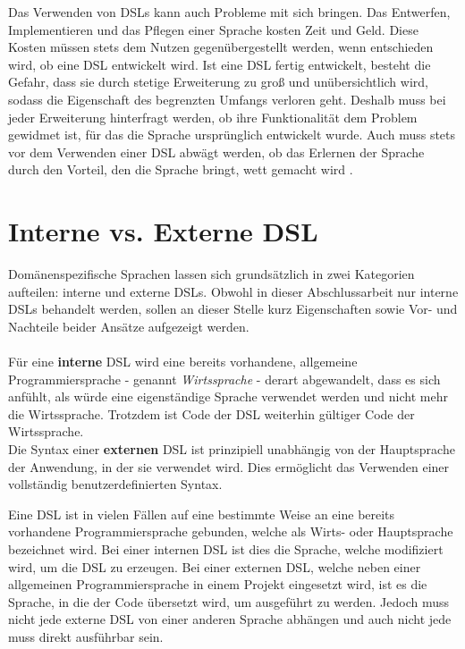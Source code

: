 Das Verwenden von DSLs kann auch Probleme mit sich bringen. Das Entwerfen, Implementieren und das Pflegen einer Sprache kosten Zeit und Geld. Diese Kosten müssen stets dem Nutzen gegenübergestellt werden, wenn entschieden wird, ob eine DSL entwickelt wird. Ist eine DSL fertig entwickelt, besteht die Gefahr, dass sie durch stetige Erweiterung zu groß und unübersichtlich wird, sodass die Eigenschaft des begrenzten Umfangs verloren geht. Deshalb muss bei jeder Erweiterung hinterfragt werden, ob ihre Funktionalität dem Problem gewidmet ist, für das die Sprache ursprünglich entwickelt wurde. Auch muss stets vor dem Verwenden einer DSL abwägt werden, ob das Erlernen der Sprache durch den Vorteil, den die Sprache bringt, wett gemacht wird \cite{www:fowlerWorkbench}.

\section{Interne vs. Externe DSL}\label{sct:2.2:intvsext}
Domänenspezifische Sprachen lassen sich grundsätzlich in zwei Kategorien aufteilen: interne und externe DSLs. Obwohl in dieser Abschlussarbeit nur interne DSLs behandelt werden, sollen an dieser Stelle kurz Eigenschaften sowie Vor- und Nachteile beider Ansätze aufgezeigt werden.
\\ \\ %
Für eine \textbf{interne} DSL wird eine bereits vorhandene, allgemeine Programmiersprache - genannt \emph{Wirtssprache} - derart abgewandelt, dass es sich anfühlt, als würde eine eigenständige Sprache verwendet werden und nicht mehr die Wirtssprache. Trotzdem ist Code der DSL weiterhin gültiger Code der Wirtssprache.\\
Die Syntax einer \textbf{externen} DSL ist prinzipiell unabhängig von der Hauptsprache der Anwendung, in der sie verwendet wird. Dies ermöglicht das Verwenden einer vollständig benutzerdefinierten Syntax.

Eine DSL ist in vielen Fällen auf eine bestimmte Weise an eine bereits vorhandene Programmiersprache gebunden, welche als Wirts- oder Hauptsprache bezeichnet wird. Bei einer internen DSL ist dies die Sprache, welche modifiziert wird, um die DSL zu erzeugen. Bei einer externen DSL, welche neben einer allgemeinen Programmiersprache in einem Projekt eingesetzt wird, ist es die Sprache, in die der Code übersetzt wird, um ausgeführt zu werden.
Jedoch muss nicht jede externe DSL von einer anderen Sprache abhängen und auch nicht jede muss direkt ausführbar sein\cite{paper:Mernik}.
\\ \\ %

